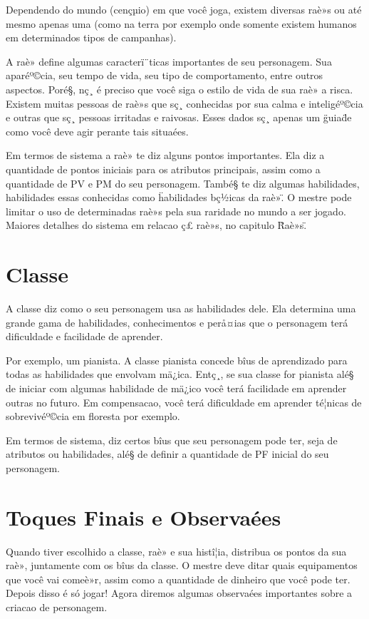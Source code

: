 Dependendo do mundo (cençµio) em que você joga, existem diversas raè»s ou até mesmo apenas uma (como na terra por exemplo onde somente existem humanos em determinados tipos de campanhas).

A raè» define algumas caracterï¨ticas importantes de seu personagem. Sua aparéº©cia, seu tempo de vida, seu tipo de comportamento, entre outros aspectos. Poré§, nç¸ é preciso que você siga o estilo de vida de sua raè» a risca. Existem muitas pessoas de raè»s que sç¸ conhecidas por sua calma e inteligéº©cia e outras que sç¸ pessoas irritadas e raivosas. Esses dados sç¸ apenas um \"guia\" de como você deve agir perante tais situaées.

Em termos de sistema a raè» te diz alguns pontos importantes. Ela diz a quantidade de pontos iniciais para os atributos principais, assim como a quantidade de PV e PM do seu personagem. També§ te diz algumas habilidades, habilidades essas conhecidas como \"habilidades bç½icas da raè»\". O mestre pode limitar o uso de determinadas raè»s pela sua raridade no mundo a ser jogado.
Maiores detalhes do sistema em relacao ç£ raè»s, no capitulo \"Raè»s\".

\section{Classe}

A classe diz como o seu personagem usa as habilidades dele. Ela determina uma grande gama de habilidades, conhecimentos e perå¤ias que o personagem terá dificuldade e facilidade de aprender.

Por exemplo, um pianista. A classe pianista concede bîus de aprendizado para todas as habilidades que envolvam mä¿ica. Entç¸, se sua classe for pianista alé§ de iniciar com algumas habilidade de mä¿ico você terá facilidade em aprender outras no futuro. Em compensacao, você terá dificuldade em aprender té¦nicas de sobrevivéº©cia em floresta por exemplo. 

Em termos de sistema, diz certos bîus que seu personagem pode ter, seja de atributos ou habilidades, alé§ de definir a quantidade de PF inicial do seu personagem. 

\section{Toques Finais e Observaées}

Quando tiver escolhido a classe, raè» e sua histî¦ia, distribua os pontos da sua raè», juntamente com os bîus da classe. O mestre deve ditar quais equipamentos que você vai comeè»r, assim como a quantidade de dinheiro que você pode ter. Depois disso é só jogar!
Agora diremos algumas observaées importantes sobre a criacao de personagem.


